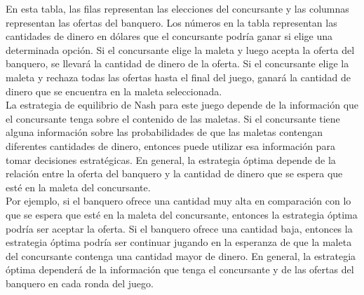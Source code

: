 En esta tabla, las filas representan las elecciones del concursante y las columnas representan las 
ofertas del banquero. Los números en la tabla representan las cantidades de dinero en dólares que 
el concursante podría ganar si elige una determinada opción. Si el concursante elige la maleta y 
luego acepta la oferta del banquero, se llevará la cantidad de dinero de la oferta. Si el concursante 
elige la maleta y rechaza todas las ofertas hasta el final del juego, ganará la cantidad de dinero 
que se encuentra en la maleta seleccionada.\\

La estrategia de equilibrio de Nash para este juego depende de la información que el concursante 
tenga sobre el contenido de las maletas. Si el concursante tiene alguna información sobre las 
probabilidades de que las maletas contengan diferentes cantidades de dinero, entonces puede utilizar 
esa información para tomar decisiones estratégicas. En general, la estrategia óptima depende de la 
relación entre la oferta del banquero y la cantidad de dinero que se espera que esté en la maleta 
del concursante.\\

Por ejemplo, si el banquero ofrece una cantidad muy alta en comparación con lo que se espera que 
esté en la maleta del concursante, entonces la estrategia óptima podría ser aceptar la oferta. 
Si el banquero ofrece una cantidad baja, entonces la estrategia óptima podría ser continuar jugando 
en la esperanza de que la maleta del concursante contenga una cantidad mayor de dinero. En general,
la estrategia óptima dependerá de la información que tenga el concursante y de las ofertas del 
banquero en cada ronda del juego.\\

